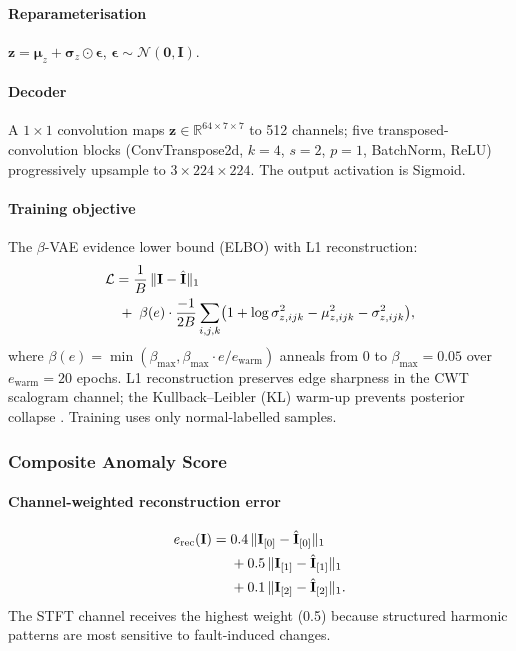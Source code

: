 \documentclass[preprint,12pt,3p]{elsarticle}
\let\cite\citep   %
\newcommand{\R}{\mathbb{R}}
\newcommand{\bI}{\mathbf{I}}
\newcommand{\bz}{\mathbf{z}}
\newcommand{\bmu}{\boldsymbol{\mu}}
\begin{document}
\paragraph{Reparameterisation}
$\bz = \bmu_z + \boldsymbol{\sigma}_z \odot \boldsymbol{\epsilon}$,
$\boldsymbol{\epsilon} \sim \mathcal{N}(\mathbf{0},\mathbf{I})$.

\paragraph{Decoder}
A $1{\times}1$ convolution maps $\bz \in \R^{64\times 7\times 7}$
to 512 channels; five transposed-convolution blocks
(ConvTranspose2d, $k{=}4$, $s{=}2$, $p{=}1$, BatchNorm, ReLU)
progressively upsample to $3{\times}224{\times}224$.
The output activation is Sigmoid.

\paragraph{Training objective}
The $\beta$-VAE evidence lower bound (ELBO) \cite{kingma2013auto,higgins2017betavae}
with L1 reconstruction:
%
\begin{align}
  \mathcal{L} &=
  \frac{1}{B}\,\|\bI - \hat{\bI}\|_1\notag\\
  &\;+\;\beta(e)\cdot\frac{-1}{2B}
  \sum_{i,j,k}\bigl(
    1 + \log\sigma_{z,ijk}^2
    - \mu_{z,ijk}^2
    - \sigma_{z,ijk}^2
  \bigr),
  \label{eq:vae_loss}
\end{align}
%
where $\beta(e)=\min(\beta_{\max}, \beta_{\max}\cdot e/e_{\mathrm{warm}})$ anneals
from 0 to $\beta_{\max}=0.05$ over $e_{\mathrm{warm}}=20$ epochs.
L1 reconstruction preserves edge sharpness in the CWT scalogram channel;
the Kullback--Leibler (KL) warm-up prevents posterior collapse \cite{lucas2019posterior}.
Training uses only normal-labelled samples.

\subsubsection{Composite Anomaly Score}
\label{sec:anomaly}

\paragraph{Channel-weighted reconstruction error}
%
\begin{align}
  e_\mathrm{rec}(\bI) =\;&
  0.4\,\|\bI_{[0]} - \hat{\bI}_{[0]}\|_1 \notag \\
  &+ 0.5\,\|\bI_{[1]} - \hat{\bI}_{[1]}\|_1 \notag \\
  &+ 0.1\,\|\bI_{[2]} - \hat{\bI}_{[2]}\|_1.
  \label{eq:rec_err}
\end{align}
%
The STFT channel receives the highest weight (0.5) because structured
harmonic patterns are most sensitive to fault-induced changes.
\end{document}

